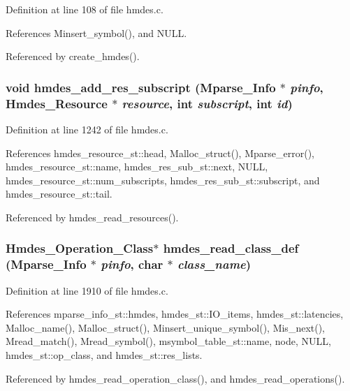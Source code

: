 Definition at line 108 of file hmdes.c.

References Minsert\_\-symbol(), and NULL.

Referenced by create\_\-hmdes().
\subsubsection{\setlength{\rightskip}{0pt plus 5cm}void hmdes\_\-add\_\-res\_\-subscript (\bf{Mparse\_\-Info} $\ast$ {\em pinfo}, \bf{Hmdes\_\-Resource} $\ast$ {\em resource}, int {\em subscript}, int {\em id})}\label{hmdes_8h_c3ce0111eb5b22ea3eb78d74799c9512}




Definition at line 1242 of file hmdes.c.

References hmdes\_\-resource\_\-st::head, Malloc\_\-struct(), Mparse\_\-error(), hmdes\_\-resource\_\-st::name, hmdes\_\-res\_\-sub\_\-st::next, NULL, hmdes\_\-resource\_\-st::num\_\-subscripts, hmdes\_\-res\_\-sub\_\-st::subscript, and hmdes\_\-resource\_\-st::tail.

Referenced by hmdes\_\-read\_\-resources().
\subsubsection{\setlength{\rightskip}{0pt plus 5cm}\bf{Hmdes\_\-Operation\_\-Class}$\ast$ hmdes\_\-read\_\-class\_\-def (\bf{Mparse\_\-Info} $\ast$ {\em pinfo}, char $\ast$ {\em class\_\-name})}\label{hmdes_8h_6f29bb3b7b186a76438eb0c3c07bcc30}




Definition at line 1910 of file hmdes.c.

References mparse\_\-info\_\-st::hmdes, hmdes\_\-st::IO\_\-items, hmdes\_\-st::latencies, Malloc\_\-name(), Malloc\_\-struct(), Minsert\_\-unique\_\-symbol(), Mis\_\-next(), Mread\_\-match(), Mread\_\-symbol(), msymbol\_\-table\_\-st::name, node, NULL, hmdes\_\-st::op\_\-class, and hmdes\_\-st::res\_\-lists.

Referenced by hmdes\_\-read\_\-operation\_\-class(), and hmdes\_\-read\_\-operations().
